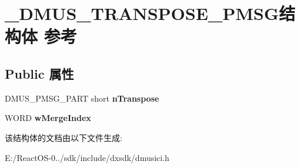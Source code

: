\hypertarget{struct___d_m_u_s___t_r_a_n_s_p_o_s_e___p_m_s_g}{}\section{\+\_\+\+D\+M\+U\+S\+\_\+\+T\+R\+A\+N\+S\+P\+O\+S\+E\+\_\+\+P\+M\+S\+G结构体 参考}
\label{struct___d_m_u_s___t_r_a_n_s_p_o_s_e___p_m_s_g}
\subsection*{Public 属性}
\begin{DoxyCompactItemize}
\item 
\mbox{\label{struct___d_m_u_s___t_r_a_n_s_p_o_s_e___p_m_s_g_a4a324f9dd29c7eb6fd1a6f45754db33c}} 
D\+M\+U\+S\+\_\+\+P\+M\+S\+G\+\_\+\+P\+A\+RT short {\bfseries n\+Transpose}
\item 
\mbox{\label{struct___d_m_u_s___t_r_a_n_s_p_o_s_e___p_m_s_g_a6e14db2030314f54840fc5054e3d516b}} 
W\+O\+RD {\bfseries w\+Merge\+Index}
\end{DoxyCompactItemize}


该结构体的文档由以下文件生成\+:\begin{DoxyCompactItemize}
\item 
E\+:/\+React\+O\+S-\/0../sdk/include/dxsdk/dmusici.\+h\end{DoxyCompactItemize}
